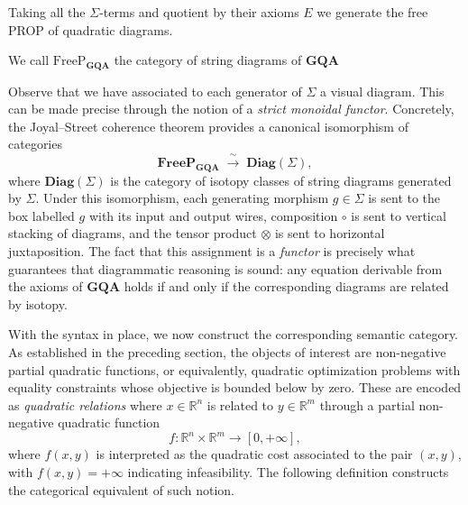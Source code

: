 Taking all the $\Sigma$-terms and quotient by their axioms $E$ we generate the free PROP of quadratic diagrams.

\begin{definition}
    We call $\text{FreeP}_{\textbf{GQA}}$ the category of string diagrams of $\textbf{GQA}$
\end{definition}

Observe that we have associated to each generator of $\Sigma$ a visual  diagram. This can be made precise through the notion of a  \emph{strict monoidal functor}. Concretely, the Joyal--Street coherence  theorem \cite{joyal1991geometry} provides a canonical isomorphism of  categories
\[
  \mathbf{FreeP}_{\mathbf{GQA}} \;\xrightarrow{\;\sim\;}\; \mathbf{Diag}(\Sigma),
\]
where $\mathbf{Diag}(\Sigma)$ is the category of isotopy classes of  string diagrams generated by $\Sigma$. Under this isomorphism, each  generating morphism $g \in \Sigma$ is sent to the box labelled $g$ with  its input and output wires, composition $\circ$ is sent to vertical  stacking of diagrams, and the tensor product $\otimes$ is sent to  horizontal juxtaposition. The fact that this assignment is a  \emph{functor} is precisely what guarantees that diagrammatic reasoning  is sound: any equation derivable from the axioms of $\mathbf{GQA}$  holds if and only if the corresponding diagrams are related by  isotopy.

With the syntax in place, we now construct the corresponding semantic  category. As established in the preceding section, the objects of interest  are non-negative partial quadratic functions, or equivalently, quadratic  optimization problems with equality constraints whose objective is bounded  below by zero. These are encoded as \emph{quadratic relations} where $x \in \mathbb{R}^n $ is related to $y \in \mathbb{R}^m$ through a partial non-negative quadratic function
\[
f : \mathbb{R}^n \times \mathbb{R}^m \to [0,+\infty],
\]
where $f(x,y)$ is interpreted as the quadratic cost associated to the pair
$(x,y)$, with $f(x,y) = +\infty$ indicating infeasibility. The following definition constructs the categorical equivalent of such notion.

